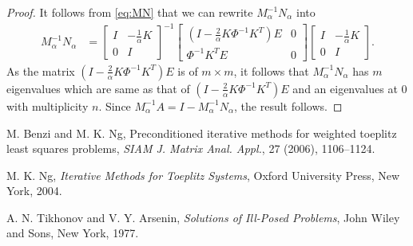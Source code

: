 \documentclass{article}
\newcommand{\bbm}{\begin{bmatrix}}
\newcommand{\ebm}{\end{bmatrix}}
\begin{document}
\begin{proof}
  It follows from \eqref{eq:MN} that we can rewrite
  $M_\alpha^{-1} N_\alpha$ into
  \begin{align*}
  M_\alpha^{-1} N_\alpha
  & = \bbm I & -\frac1\alpha K \\ 0 & I \ebm^{-1}
      \bbm (I-\frac2\alpha K\Phi^{-1}K^T)E & 0 \\ \Phi^{-1}K^TE & 0 \ebm
      \bbm I & -\frac1\alpha K \\ 0 & I \ebm.
  \end{align*}
  As the matrix $(I-\frac2\alpha K\Phi^{-1}K^T)E$ is of $m\times m$,
  it follows that $M_\alpha^{-1} N_\alpha$ has $m$ eigenvalues which are
  same as that of $(I-\frac2\alpha K\Phi^{-1}K^T)E$ and
  an eigenvalues at $0$ with multiplicity $n$.
  Since $M_\alpha^{-1} A = I - M_\alpha^{-1} N_\alpha$,
  the result follows.
\end{proof}


\begin{thebibliography}{99}

\newblock M. Benzi and M. K. Ng,
\newblock Preconditioned iterative methods for weighted toeplitz
    least squares problems,
\newblock \emph{SIAM J. Matrix Anal. Appl.}, 27 (2006), 1106--1124.

\newblock M. K. Ng,
\newblock \emph{Iterative Methods for Toeplitz Systems},
\newblock Oxford University Press, New York, 2004.

\newblock A. N. Tikhonov and V. Y. Arsenin,
\newblock \emph{Solutions of Ill-Posed Problems},
\newblock John Wiley and Sons, New York, 1977.

\end{thebibliography}
\end{document}
